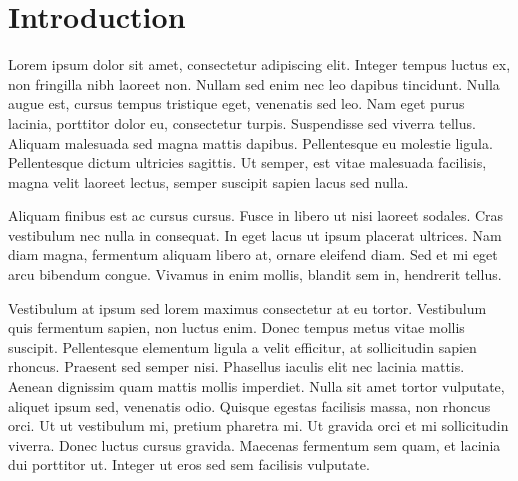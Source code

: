 \section{Introduction}
	Lorem ipsum dolor sit amet, consectetur adipiscing elit. Integer tempus luctus ex, non fringilla nibh laoreet non. Nullam sed enim nec leo dapibus tincidunt. Nulla augue est, cursus tempus tristique eget, venenatis sed leo. Nam eget purus lacinia, porttitor dolor eu, consectetur turpis. Suspendisse sed viverra tellus. Aliquam malesuada sed magna mattis dapibus. Pellentesque eu molestie ligula. Pellentesque dictum ultricies sagittis. Ut semper, est vitae malesuada facilisis, magna velit laoreet lectus, semper suscipit sapien lacus sed nulla.

	Aliquam finibus est ac cursus cursus. Fusce in libero ut nisi laoreet sodales. Cras vestibulum nec nulla in consequat. In eget lacus ut ipsum placerat ultrices. Nam diam magna, fermentum aliquam libero at, ornare eleifend diam. Sed et mi eget arcu bibendum congue. Vivamus in enim mollis, blandit sem in, hendrerit tellus.

	Vestibulum at ipsum sed lorem maximus consectetur at eu tortor. Vestibulum quis fermentum sapien, non luctus enim. Donec tempus metus vitae mollis suscipit. Pellentesque elementum ligula a velit efficitur, at sollicitudin sapien rhoncus. Praesent sed semper nisi. Phasellus iaculis elit nec lacinia mattis. Aenean dignissim quam mattis mollis imperdiet. Nulla sit amet tortor vulputate, aliquet ipsum sed, venenatis odio. Quisque egestas facilisis massa, non rhoncus orci. Ut ut vestibulum mi, pretium pharetra mi. Ut gravida orci et mi sollicitudin viverra. Donec luctus cursus gravida. Maecenas fermentum sem quam, et lacinia dui porttitor ut. Integer ut eros sed sem facilisis vulputate.





















